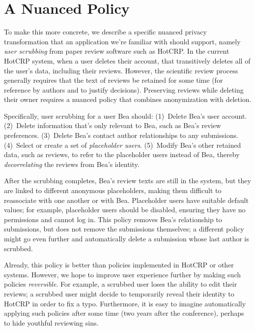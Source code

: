 \section{A Nuanced Policy}
\label{design:eg}


To make this more concrete, we describe a specific nuanced privacy
transformation that an application we're familiar with should support, namely
\emph{user scrubbing} from paper review software such as HotCRP.
%
In the current HotCRP system, when a user deletes their account, that
transitively deletes all of the user's data, including their reviews.
%
However, the scientific review process generally requires that the text of
reviews be retained for some time (for reference by authors and to justify
decisions).
%
Preserving reviews while deleting their owner requires a nuanced policy
that combines anonymization with deletion.


Specifically, user scrubbing for a user Bea should:
%
(1)~Delete Bea's user account.
%
(2)~Delete information that's only relevant to Bea, such as Bea's review
preferences.
%
(3)~Delete Bea's contact author relationships to any submissions.
%
(4)~Select or create a set of \emph{placeholder users}.
%
(5)~Modify Bea's other retained data, such as reviews, to refer to the
placeholder users instead of Bea, thereby \emph{decorrelating} the reviews from Bea's identity.


After the scrubbing completes, Bea's review texts are still in the system, but
they are linked to different anonymous placeholders, making them difficult to
reassociate with one another or with Bea.
%
Placeholder users have suitable default values; for example, placeholder
users should be disabled,
ensuring they have no permissions and cannot log in.
%
This policy removes Bea's relationship to submissions, but does not remove the
submissions themselves; a different policy might go even further and
automatically delete a submission whose last author is scrubbed.
%

Already, this policy is better than policies implemented in HotCRP or other systems.
%
However, we hope to improve user experience further by making such policies
\emph{reversible}.
%
For example, a scrubbed user loses the ability to edit their reviews; a
scrubbed user might decide to temporarily reveal their identity to HotCRP in
order to fix a typo.
%
Furthermore, it is easy to imagine automatically applying such policies
after some time (\eg two years after the conference), perhaps to hide youthful
reviewing sins.
%

